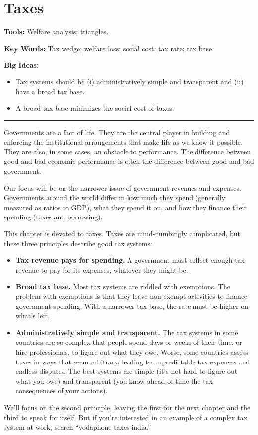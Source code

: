 \chapter{Taxes}\label{chp:tax}
\hypertarget{taxes}{}

\textbf{Tools:} Welfare analysis; triangles.

\textbf{Key Words:} Tax wedge; welfare loss; social cost; tax rate; tax base.

\textbf{Big Ideas:}
\vspace{-0.1in}
\begin{itemize}
\item Tax systems should be (i) administratively simple and transparent and (ii) have a broad tax base.
\item A broad tax base minimizes the social cost of taxes.
\end{itemize}
\rule{\textwidth}{1pt}

Governments are a fact of life. They are the central player in building and enforcing
the institutional arrangements that make %
life as we know it possible.
They are also, in some cases, an obstacle to performance.
The difference between good and bad economic performance
is often the difference between good and bad government.

Our focus will be on the narrower issue of government revenues and expenses.
Governments around the world differ
in how much they spend (generally measured as ratios to GDP),
what they spend it on,
and how they finance their spending (taxes and borrowing).

This chapter is devoted to taxes.
Taxes are mind-numbingly complicated, but these three principles
describe good tax systems:
%
\begin{itemize}
\item \textbf{Tax revenue pays for spending.}
A government must collect enough tax revenue to pay for its expenses,
whatever they might be.

\item \textbf{Broad tax base.}
Most tax systems are riddled with exemptions.
The problem with exemptions is that they leave non-exempt activities to finance government spending.
With a narrower tax base, the rate must be higher on what's left.

\item \textbf{Administratively simple and transparent.}
The tax systems in some countries are so complex that people spend
days or weeks of their time, or hire professionals, to figure out
what they owe.
Worse, some countries assess taxes in ways that seem arbitrary,
leading to unpredictable tax expenses and endless disputes.
The best systems are simple (it's not hard to figure out what you owe)
and transparent (you know ahead of time the tax consequences of your actions).

\end{itemize}
%
We'll focus on the second principle, leaving the first for the next chapter 
and the third to speak for itself.
But if you're interested in an example of a complex tax system
at work, search ``vodaphone taxes india.''


